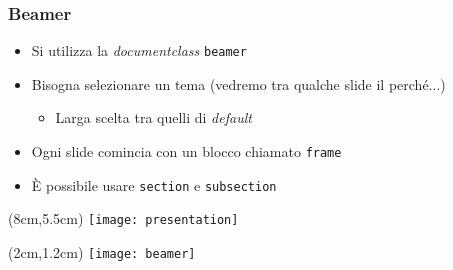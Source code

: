 \begin{frame}
  
  \frametitle{Beamer}
  
  \begin{itemize}
   \item Si utilizza la \textit{documentclass} \texttt{beamer}
   \item Bisogna selezionare un tema (vedremo tra qualche slide il perché...)
   \begin{itemize}
    \item Larga scelta tra quelli di \textit{default}
   \end{itemize}
   \item Ogni slide comincia con un blocco chiamato \texttt{frame}
   \item È possibile usare \texttt{section} e \texttt{subsection}
  \end{itemize}
  
 \begin{textblock*}{5cm}(8cm,5.5cm)
   \texttt{[image: presentation]}
 \end{textblock*}
 
 \begin{textblock*}{5cm}(2cm,1.2cm)
   \texttt{[image: beamer]}
 \end{textblock*}

\end{frame}
